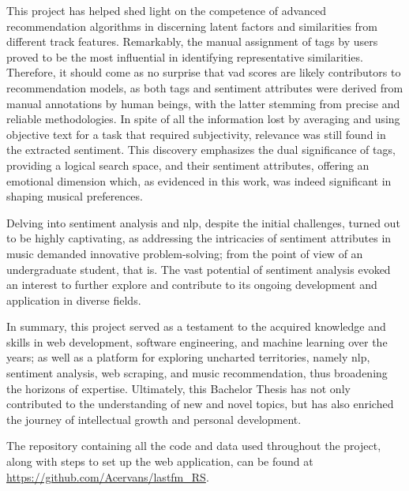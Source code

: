 This project has helped shed light on the competence of advanced recommendation algorithms in discerning latent factors and similarities from different track features. Remarkably, the manual assignment of tags by users proved to be the most influential in identifying representative similarities. Therefore, it should come as no surprise that \acs{vad} scores are likely contributors to recommendation models, as both tags and sentiment attributes were derived from manual annotations by human beings, with the latter stemming from precise and reliable methodologies. In spite of all the information lost by averaging and using objective text for a task that required subjectivity, relevance was still found in the extracted sentiment. This discovery emphasizes the dual significance of tags, providing a logical search space, and their sentiment attributes, offering an emotional dimension which, as evidenced in this work, was indeed significant in shaping musical preferences.

Delving into sentiment analysis and \acs{nlp}, despite the initial challenges, turned out to be highly captivating, as addressing the intricacies of sentiment attributes in music demanded innovative problem-solving; from the point of view of an undergraduate student, that is. The vast potential of sentiment analysis evoked an interest to further explore and contribute to its ongoing development and application in diverse fields.

In summary, this project served as a testament to the acquired knowledge and skills in web development, software engineering, and machine learning over the years; as well as a platform for exploring uncharted territories, namely \acs{nlp}, sentiment analysis, web scraping, and music recommendation, thus broadening the horizons of expertise. Ultimately, this Bachelor Thesis has not only contributed to the understanding of new and novel topics, but has also enriched the journey of intellectual growth and personal development.

The repository containing all the code and data used throughout the project, along with steps to set up the web application, can be found at \url{https://github.com/Acervans/lastfm_RS}.